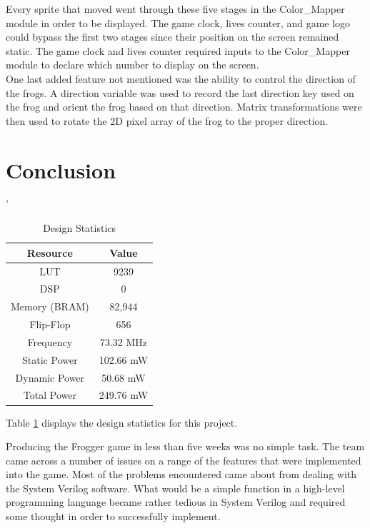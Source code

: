 \documentclass[journal, twocolumn, final,11pt,letterpaper]{IEEEtran}
\begin{document}
Every sprite that moved went through these five stages in the  Color\_Mapper module in order to be displayed.  The game clock, lives counter, and game logo could bypass the first two stages since their position on the screen remained static.  The game clock and lives counter required inputs to the Color\_Mapper module to declare which number to display on the screen. \\

One last added feature not mentioned was the ability to control the direction of the frogs.  A direction variable was used to record the last direction key used on the frog and orient the frog based on that direction.  Matrix transformations were then used to rotate the 2D pixel array of the frog to the proper direction.  \\  	
	

\section{Conclusion} '
\begin{table}[htbp]
	\centering
	\begin{tabular}{c|c}	%
		\toprule	%
		Resource & Value \\
		\midrule
		LUT & 9239\\
		DSP & 0\\
		Memory (BRAM) & 82,944\\
		Flip-Flop & 656\\
		Frequency &  73.32 MHz\\
		Static Power & 102.66 mW\\
		Dynamic Power & 50.68 mW\\
		Total Power & 249.76 mW\\
		\bottomrule	%
	\end{tabular}%
	\caption{Design Statistics}
	\label{tab:design}
\end{table}

Table \ref{tab:design} displays the design statistics for this project. 

Producing the Frogger game in less than five weeks was no simple task.  The team came across a number of issues on a range of the features that were implemented into the game.  Most of the problems encountered came about from dealing with the System Verilog software.  What would be a simple function in a high-level programming language became rather tedious in System Verilog and required some thought in order to successfully implement.  \\
\end{document}
